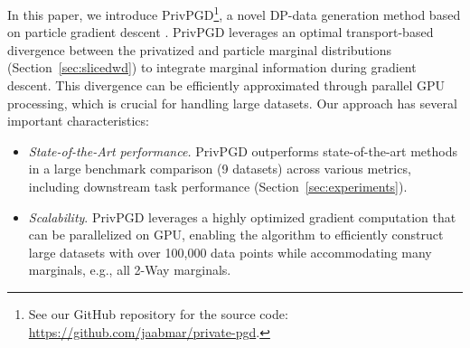 In this paper, we introduce PrivPGD\footnote{See our GitHub repository for the source code: \url{https://github.com/jaabmar/private-pgd}.}, a novel DP-data generation method based on particle gradient descent \citep{chizat2018global, chizat2022sparse}. PrivPGD leverages an optimal transport-based divergence between the privatized and particle marginal distributions (Section~\ref{sec:slicedwd}) to integrate marginal information during gradient descent. This divergence can be efficiently approximated through parallel GPU processing, which is crucial for handling large datasets. Our approach has several important characteristics:

\begin{itemize}

\item \textit{State-of-the-Art performance.} PrivPGD outperforms state-of-the-art methods in a large benchmark comparison (9 datasets) across various metrics, including downstream task performance (Section~\ref{sec:experiments}).



  \item \textit{Scalability}. PrivPGD leverages a highly optimized gradient computation
 that can be parallelized on GPU, enabling the algorithm to efficiently construct large datasets with over 100,000 data points while accommodating many marginals, e.g., all 2-Way marginals. 

 
 

 
 
 
 


\end{itemize}
